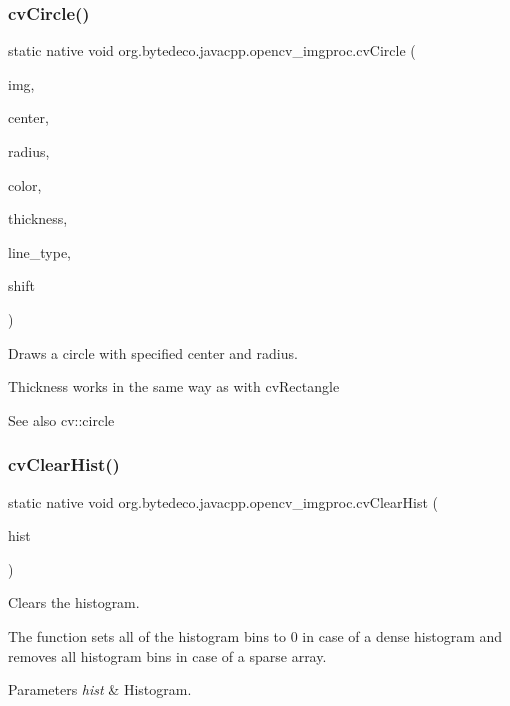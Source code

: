 \subsubsection{\texorpdfstring{cv\+Circle()}{cvCircle()}}
{\footnotesize\ttfamily static native void org.\+bytedeco.\+javacpp.\+opencv\+\_\+imgproc.\+cv\+Circle (\begin{DoxyParamCaption}\item[{Cv\+Arr}]{img,  }\item[{@By\+Val Cv\+fr.antproject.utils.Point}]{center,  }\item[{int}]{radius,  }\item[{@By\+Val Cv\+Scalar}]{color,  }\item[{int}]{thickness,  }\item[{int}]{line\+\_\+type,  }\item[{int}]{shift }\end{DoxyParamCaption})\hspace{0.3cm}{\ttfamily [static]}}



Draws a circle with specified center and radius. 

Thickness works in the same way as with cv\+Rectangle \begin{DoxySeeAlso}{See also}
cv\+::circle 
\end{DoxySeeAlso}
\mbox{\label{group__imgproc__c_ga9591f26ede9fd9b7c61d24dc2016cfc9}} 
\subsubsection{\texorpdfstring{cv\+Clear\+Hist()}{cvClearHist()}}
{\footnotesize\ttfamily static native void org.\+bytedeco.\+javacpp.\+opencv\+\_\+imgproc.\+cv\+Clear\+Hist (\begin{DoxyParamCaption}\item[{Cv\+Histogram}]{hist }\end{DoxyParamCaption})\hspace{0.3cm}{\ttfamily [static]}}



Clears the histogram. 

The function sets all of the histogram bins to 0 in case of a dense histogram and removes all histogram bins in case of a sparse array. 


\begin{DoxyParams}{Parameters}
{\em hist} & Histogram. \\
\hline
\end{DoxyParams}
\mbox{\label{group__imgproc__c_ga1bff7c65c8a997286cfb28f978c3d9f4}} 
